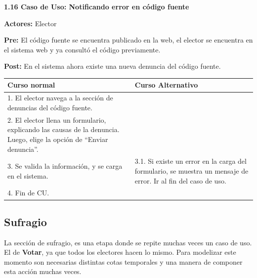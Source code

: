 \textbf{1.16 Caso de Uso: Notificando error en código fuente}

\textbf{Actores:}  Elector

\textbf{Pre:} El código fuente se encuentra publicado en la web, el elector se encuentra en el sistema web y ya consultó el código previamente.

\textbf{Post:} En el sistema ahora existe una nueva denuncia del código fuente.
\begin{table}[h!]
	
 \begin{tabular}{|p{7.5cm} | p{7.5cm}|} 
 \hline
 \textbf{Curso normal} & \textbf{Curso Alternativo} \\
 \hline
1. El elector navega a la sección de denuncias del código fuente. & \\
\hline


2. El elector llena un formulario, explicando las causas de la denuncia. Luego, elige la opción de “Enviar denuncia”. & \\
\hline


3. Se valida la información, y se carga en el sistema. & 3.1. Si existe un error en la carga del formulario, se muestra un mensaje de error. Ir al fin del caso de uso. \\
\hline
4. Fin de CU.& \\
\hline
 \end{tabular}

\end{table}



\subsection{Sufragio}

La sección de sufragio, es una etapa donde se repite muchas veces un caso de uso. El de \textbf{Votar}, ya que todos los electores hacen lo mismo. Para modelizar este momento son necesarias distintas cotas temporales y una manera de componer esta acción muchas veces.





